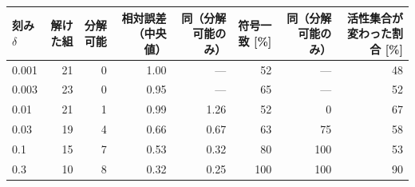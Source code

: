 \begin{tabular}{lrrrrrrr}
\toprule
刻み $\delta$ & 解けた組 & 分解可能 & 相対誤差（中央値） & 同（分解可能のみ） & 符号一致 [\%] & 同（分解可能のみ） & 活性集合が変わった割合 [\%] \\
\midrule
0.001 & 21 & 0 & 1.00 & --- & 52 & --- & 48 \\
0.003 & 23 & 0 & 0.95 & --- & 65 & --- & 52 \\
0.01 & 21 & 1 & 0.99 & 1.26 & 52 & 0 & 67 \\
0.03 & 19 & 4 & 0.66 & 0.67 & 63 & 75 & 58 \\
0.1 & 15 & 7 & 0.53 & 0.32 & 80 & 100 & 53 \\
0.3 & 10 & 8 & 0.32 & 0.25 & 100 & 100 & 90 \\
\bottomrule
\end{tabular}
